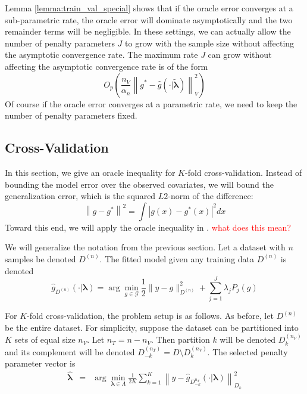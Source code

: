 \documentclass[12pt]{article}
\begin{document}
Lemma \ref{lemma:train_val_special} shows that if the oracle error converges at a sub-parametric rate, the oracle error will dominate asymptotically and the two remainder terms will be negligible. In these settings, we can actually allow the number of penalty parameters $J$ to grow with the sample size without affecting the asymptotic convergence rate. The maximum rate $J$ can grow without affecting the asymptotic convergence rate is of the form
\begin{equation}
O_p\left (
\frac{n_{V}}{\alpha_n}
\left \| g^*-\hat{g}(\cdot | \tilde{\boldsymbol {\lambda}}) \right \|_{V}^2
\right)
\end{equation}
Of course if the oracle error converges at a parametric rate, we need to keep the number of penalty parameters fixed.

\subsection{Cross-Validation}

In this section, we give an oracle inequality for $K$-fold cross-validation. Instead of bounding the model error over the observed covariates, we will bound the generalization error, which is the squared $L2$-norm of the difference:
\begin{equation}
\left \| g - g^* \right \|^2 = \int \left |g(x) - g^*(x) \right |^2 dx
\end{equation}
Toward this end, we will apply the oracle inequality in \citet{lecue2012oracle}. \textcolor{red}{what does this mean?}

We will generalize the notation from the previous section. Let a dataset with $n$ samples be denoted $D^{(n)}$. The fitted model given any training data $D^{(n)}$ is denoted
\begin{equation}
\hat{g}_{D^{(n)}}(\cdot | \boldsymbol \lambda)= \arg\min_{g\in\mathcal{G}} \frac{1}{2} \| y-g \|_{D^{(n)}}^{2} + \sum_{j=1}^J \lambda_j P_j(g)
\end{equation}

For $K$-fold cross-validation, the problem setup is as follows. As before, let $D^{(n)}$ be the entire dataset. For simplicity, suppose the dataset can be partitioned into $K$ sets of equal size $n_V$. Let $n_T = n - n_V$. Then partition $k$ will be denoted $D_k^{(n_V)}$ and its complement will be denoted $D_{-k}^{(n_T)} = D \setminus D_k^{(n_V)}$. The selected penalty parameter vector is
\begin{eqnarray}
\label{kfold_opt}
\hat{\boldsymbol \lambda} &=& \arg\min_{\boldsymbol{\lambda} \in\Lambda} \frac{1}{2K} \sum_{k=1}^K  \left \| y-\hat{g}_{D_{-k}^{n_T}}(\cdot | \boldsymbol \lambda) \right \|_{D_k}^{2}
\end{eqnarray}
\end{document}
